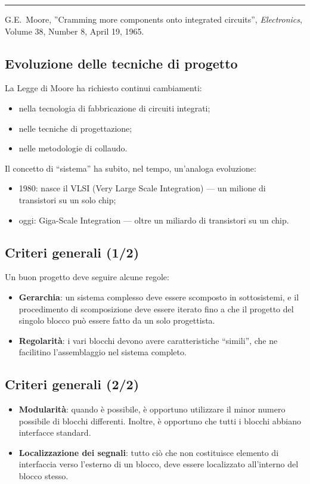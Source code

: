 \documentclass[10pt,a4paper,twoside,twocolumn]{article}
\begin{document}
\hrule
\vspace{3mm}

{\footnotesize
G.E.~Moore, ''Cramming more components onto integrated circuits'', \emph{Electronics}, Volume 38, Number 8, April 19, 1965.
}



\subsection{Evoluzione delle tecniche di progetto}
La Legge di Moore ha richiesto continui cambiamenti: 
\begin{itemize}
\item nella tecnologia di fabbricazione di circuiti integrati;
\item nelle tecniche di progettazione;
\item nelle metodologie di collaudo.
\end{itemize}
Il concetto di ``sistema'' ha subito, nel tempo, un'analoga evoluzione:
\begin{itemize}
\item 1980: nasce il VLSI (Very Large Scale Integration) --- un milione di transistori su un solo chip;
\item oggi: Giga-Scale Integration --- oltre un miliardo di transistori su un chip.
\end{itemize}




\subsection{Criteri generali (1/2)}
Un buon progetto deve seguire alcune regole:
\begin{itemize}
\item 
\textbf{Gerarchia}: un sistema complesso deve essere scomposto in sottosistemi, 
e il procedimento di scomposizione deve essere iterato fino a che il progetto del singolo blocco pu\`o essere fatto da un solo progettista.
\item 
\textbf{Regolarit\`a}: i vari blocchi devono avere caratteristiche ``simili'', 
che ne facilitino l'assemblaggio nel sistema completo.
\end{itemize}



\subsection{Criteri generali (2/2)}
\begin{itemize}
\item 
\textbf{Modularit\`a}: quando \`e possibile, \`e opportuno utilizzare il minor numero possibile di blocchi differenti. Inoltre, \`e opportuno che tutti i blocchi abbiano
interfacce standard.
\item
\textbf{Localizzazione dei segnali}: tutto ci\`o che non costituisce elemento di interfaccia verso l'esterno di un blocco, deve essere localizzato all'interno del blocco stesso.
\end{itemize}
\end{document}
